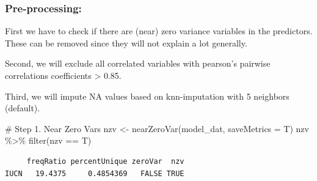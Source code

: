 \documentclass[
  letterpaper,
  DIV=11,
  numbers=noendperiod]{scrartcl}
\newenvironment{Shaded}{\begin{snugshade}}{\end{snugshade}}
\newcommand{\AttributeTok}[1]{\textcolor[rgb]{0.40,0.45,0.13}{#1}}
\newcommand{\CommentTok}[1]{\textcolor[rgb]{0.37,0.37,0.37}{#1}}
\newcommand{\DecValTok}[1]{\textcolor[rgb]{0.68,0.00,0.00}{#1}}
\newcommand{\FunctionTok}[1]{\textcolor[rgb]{0.28,0.35,0.67}{#1}}
\newcommand{\NormalTok}[1]{\textcolor[rgb]{0.00,0.23,0.31}{#1}}
\newcommand{\OtherTok}[1]{\textcolor[rgb]{0.00,0.23,0.31}{#1}}
\newcommand{\SpecialCharTok}[1]{\textcolor[rgb]{0.37,0.37,0.37}{#1}}
\begin{document}
\subsubsection{Pre-processing:}\label{pre-processing}

First we have to check if there are (near) zero variance variables in
the predictors. These can be removed since they will not explain a lot
generally.

Second, we will exclude all correlated variables with pearson's pairwise
correlations coefficients \textgreater{} 0.85.

Third, we will impute NA values based on knn-imputation with 5 neighbors
(default).

\begin{Shaded}
\begin{Highlighting}[]
\CommentTok{\# Step 1. Near Zero Vars}
\NormalTok{nzv }\OtherTok{\textless{}{-}} \FunctionTok{nearZeroVar}\NormalTok{(model\_dat, }\AttributeTok{saveMetrics =}\NormalTok{ T)}
\NormalTok{nzv }\SpecialCharTok{\%\textgreater{}\%} \FunctionTok{filter}\NormalTok{(nzv }\SpecialCharTok{==}\NormalTok{ T)}
\end{Highlighting}
\end{Shaded}

\begin{verbatim}
     freqRatio percentUnique zeroVar  nzv
IUCN   19.4375     0.4854369   FALSE TRUE
\end{verbatim}

\begin{Shaded}
\end{Shaded}
\end{document}
